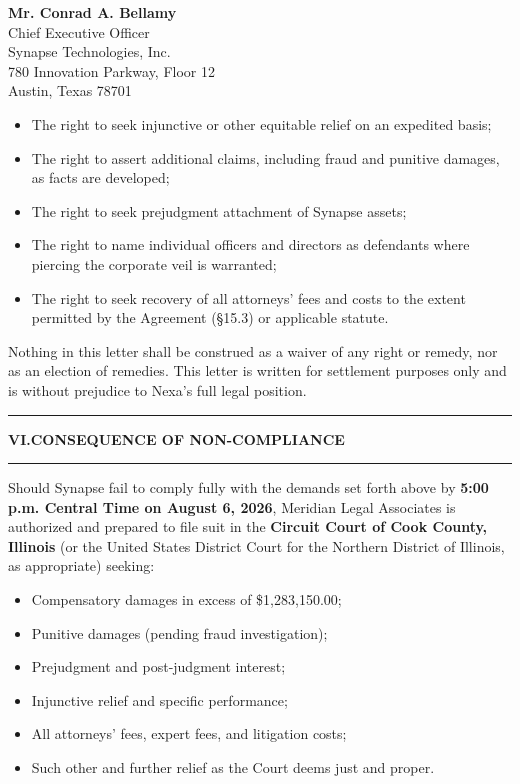 \documentclass[
  paper=letter,
  fontsize=10.5pt,
  parskip=half,
  firsthead=true,
  fromalign=right,
  fromrule=false,
  addrfield=topaligned,
  subject=titled,
  foldmarks=false
]{scrlttr2}
\newcommand{\sectionrule}{%
  \par\vspace{2pt}%
  {\color{GoldAccent}\rule{\linewidth}{0.8pt}}%
  \par\vspace{4pt}%
}
\begin{document}
\begin{letter}{%
  \textbf{Mr. Conrad A. Bellamy}\\
  Chief Executive Officer\\
  Synapse Technologies, Inc.\\
  780 Innovation Parkway, Floor 12\\
  Austin, Texas 78701%
}
\begin{tcolorbox}[trackingstyle]
\vspace{4pt}
\begin{itemize}[leftmargin=1.4em, itemsep=2pt, topsep=0pt]
  \item The right to seek injunctive or other equitable relief on an expedited basis;
  \item The right to assert additional claims, including fraud and punitive damages, as facts are developed;
  \item The right to seek prejudgment attachment of Synapse assets;
  \item The right to name individual officers and directors as defendants where piercing the corporate veil is warranted;
  \item The right to seek recovery of all attorneys' fees and costs to the extent permitted by the Agreement (\S 15.3) or applicable statute.
\end{itemize}

\vspace{4pt}
\noindent Nothing in this letter shall be construed as a waiver of any right or remedy, nor as an election of remedies. This letter is written for settlement purposes only and is without prejudice to Nexa's full legal position.
\end{tcolorbox}

\vspace{4pt}
\sectionrule
{\sffamily\bfseries\color{NavyDeep}\normalsize VI.\enspace CONSEQUENCE OF NON-COMPLIANCE}
\sectionrule

\begin{tcolorbox}[alertstyle={NOTICE OF LITIGATION INTENT}]
\noindent\faGavel\enspace Should Synapse fail to comply fully with the demands set forth above by \textbf{5:00 p.m. Central Time on August 6, 2026}, Meridian Legal Associates is authorized and prepared to file suit in the \textbf{Circuit Court of Cook County, Illinois} (or the United States District Court for the Northern District of Illinois, as appropriate) seeking:

\vspace{4pt}
\begin{itemize}[leftmargin=1.4em, itemsep=2pt, topsep=0pt,
    label={\color{RubyAlert}\faAngleRight}]
  \item Compensatory damages in excess of \$1,283,150.00;
  \item Punitive damages (pending fraud investigation);
  \item Prejudgment and post-judgment interest;
  \item Injunctive relief and specific performance;
  \item All attorneys' fees, expert fees, and litigation costs;
  \item Such other and further relief as the Court deems just and proper.
\end{itemize}


\end{tcolorbox}
\end{letter}
\end{document}
